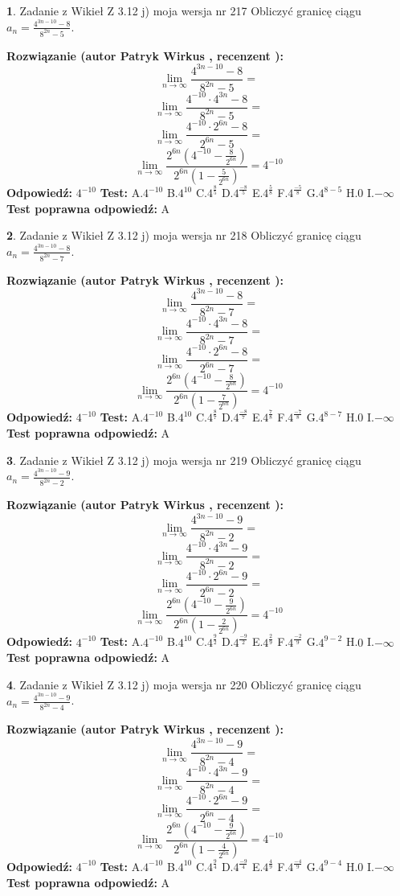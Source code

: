 \documentclass[12pt, a4paper]{article}
\theoremstyle{definition} %
\newtheorem{zad}{}
\newcommand{\zadStart}[1]{\begin{zad}#1\newline}
\newcommand{\zadStop}{\end{zad}}
\newcommand{\rozwStart}[2]{\noindent \textbf{Rozwiązanie (autor #1 , recenzent #2): }\newline}
\newcommand{\rozwStop}{\newline}
\newcommand{\odpStart}{\noindent \textbf{Odpowiedź:}\newline}
\newcommand{\odpStop}{\newline}
\newcommand{\testStart}{\noindent \textbf{Test:}\newline}
\newcommand{\testStop}{\newline}
\newcommand{\kluczStart}{\noindent \textbf{Test poprawna odpowiedź:}\newline}
\newcommand{\kluczStop}{\newline}
\begin{document}
\zadStart{Zadanie z Wikieł Z 3.12 j) moja wersja nr 217}
Obliczyć granicę ciągu $a_{n}=\frac{4^{3n-10}-8}{8^{2n}-5}$.
\zadStop
\rozwStart{Patryk Wirkus}{}
$$\lim\limits_{n\to\infty}\frac{4^{3n-10}-8}{8^{2n}-5}=$$
$$\lim\limits_{n\to\infty}\frac{4^{-10} \cdot 4^{3n}-8}{8^{2n}-5}=$$
$$\lim\limits_{n\to\infty}\frac{4^{-10} \cdot 2^{6n}-8}{2^{6n}-5}=$$
$$\lim\limits_{n\to\infty}\frac{2^{6n}(4^{-10} - \frac{8}{2^{6n}})}{2^{6n}(1-\frac{5}{2^{6n}})}= 4^{-10}$$
\rozwStop
\odpStart
$4^{-10}$
\odpStop
\testStart
A.$4^{-10}$
B.$4^{10}$
C.$4^{\frac{8}{5}}$
D.$4^{\frac{-8}{5}}$
E.$4^{\frac{5}{8}}$
F.$4^{\frac{-5}{8}}$
G.$4^{8-5}$
H.$0$
I.$-\infty$
\testStop
\kluczStart
A
\kluczStop



\zadStart{Zadanie z Wikieł Z 3.12 j) moja wersja nr 218}
Obliczyć granicę ciągu $a_{n}=\frac{4^{3n-10}-8}{8^{2n}-7}$.
\zadStop
\rozwStart{Patryk Wirkus}{}
$$\lim\limits_{n\to\infty}\frac{4^{3n-10}-8}{8^{2n}-7}=$$
$$\lim\limits_{n\to\infty}\frac{4^{-10} \cdot 4^{3n}-8}{8^{2n}-7}=$$
$$\lim\limits_{n\to\infty}\frac{4^{-10} \cdot 2^{6n}-8}{2^{6n}-7}=$$
$$\lim\limits_{n\to\infty}\frac{2^{6n}(4^{-10} - \frac{8}{2^{6n}})}{2^{6n}(1-\frac{7}{2^{6n}})}= 4^{-10}$$
\rozwStop
\odpStart
$4^{-10}$
\odpStop
\testStart
A.$4^{-10}$
B.$4^{10}$
C.$4^{\frac{8}{7}}$
D.$4^{\frac{-8}{7}}$
E.$4^{\frac{7}{8}}$
F.$4^{\frac{-7}{8}}$
G.$4^{8-7}$
H.$0$
I.$-\infty$
\testStop
\kluczStart
A
\kluczStop



\zadStart{Zadanie z Wikieł Z 3.12 j) moja wersja nr 219}
Obliczyć granicę ciągu $a_{n}=\frac{4^{3n-10}-9}{8^{2n}-2}$.
\zadStop
\rozwStart{Patryk Wirkus}{}
$$\lim\limits_{n\to\infty}\frac{4^{3n-10}-9}{8^{2n}-2}=$$
$$\lim\limits_{n\to\infty}\frac{4^{-10} \cdot 4^{3n}-9}{8^{2n}-2}=$$
$$\lim\limits_{n\to\infty}\frac{4^{-10} \cdot 2^{6n}-9}{2^{6n}-2}=$$
$$\lim\limits_{n\to\infty}\frac{2^{6n}(4^{-10} - \frac{9}{2^{6n}})}{2^{6n}(1-\frac{2}{2^{6n}})}= 4^{-10}$$
\rozwStop
\odpStart
$4^{-10}$
\odpStop
\testStart
A.$4^{-10}$
B.$4^{10}$
C.$4^{\frac{9}{2}}$
D.$4^{\frac{-9}{2}}$
E.$4^{\frac{2}{9}}$
F.$4^{\frac{-2}{9}}$
G.$4^{9-2}$
H.$0$
I.$-\infty$
\testStop
\kluczStart
A
\kluczStop



\zadStart{Zadanie z Wikieł Z 3.12 j) moja wersja nr 220}
Obliczyć granicę ciągu $a_{n}=\frac{4^{3n-10}-9}{8^{2n}-4}$.
\zadStop
\rozwStart{Patryk Wirkus}{}
$$\lim\limits_{n\to\infty}\frac{4^{3n-10}-9}{8^{2n}-4}=$$
$$\lim\limits_{n\to\infty}\frac{4^{-10} \cdot 4^{3n}-9}{8^{2n}-4}=$$
$$\lim\limits_{n\to\infty}\frac{4^{-10} \cdot 2^{6n}-9}{2^{6n}-4}=$$
$$\lim\limits_{n\to\infty}\frac{2^{6n}(4^{-10} - \frac{9}{2^{6n}})}{2^{6n}(1-\frac{4}{2^{6n}})}= 4^{-10}$$
\rozwStop
\odpStart
$4^{-10}$
\odpStop
\testStart
A.$4^{-10}$
B.$4^{10}$
C.$4^{\frac{9}{4}}$
D.$4^{\frac{-9}{4}}$
E.$4^{\frac{4}{9}}$
F.$4^{\frac{-4}{9}}$
G.$4^{9-4}$
H.$0$
I.$-\infty$
\testStop
\kluczStart
A
\kluczStop
\end{document}
